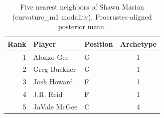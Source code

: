 \begin{table}[htbp]
  \centering\small
  \begin{tabular}{rllc}
    \toprule
    Rank & Player & Position & Archetype \\
    \midrule
    1 & Alonzo Gee & G & 1 \\
    2 & Greg Buckner & G & 1 \\
    3 & Josh Howard & F & 1 \\
    4 & J.R. Reid & F & 1 \\
    5 & JaVale McGee & C & 4 \\
    \bottomrule
  \end{tabular}
  \caption{Five nearest neighbors of Shawn Marion (curvature_m1 modality), Procrustes-aligned posterior mean.}
  \label{tab:Shawn_Marion_neighbors_curvature_m1}
\end{table}

